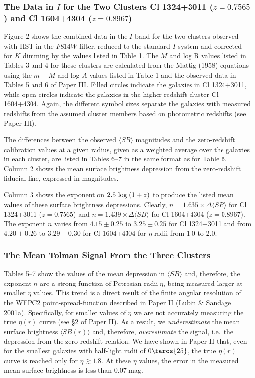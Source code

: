 \documentclass[preprint]{aastex}
\begin{document}
\subsubsection{The Data in $I$ for the Two Clusters Cl 1324+3011 
($z = 0.7565$) and Cl 1604+4304 ($z = 0.8967$)}
 
Figure 2 shows the combined data in the $I$ band for the two clusters
observed with HST in the $F814W$ filter, reduced to the standard $I$
system and corrected for $K$ dimming by the values listed in Table
1. The $M$ and log R values listed in Tables 3 and 4 for these
clusters are calculated from the Mattig (1958) equations using the $m
- M$ and log $A$ values listed in Table 1 and the observed data in
Tables 5 and 6 of Paper III.  Filled circles indicate the galaxies in
Cl 1324+3011, while open circles indicate the galaxies in the
higher-redshift cluster Cl 1604+4304. Again, the different symbol
sizes separate the galaxies with measured redshifts from the assumed
cluster members based on photometric redshifts (see Paper III).

The differences between the observed $\langle SB \rangle$ magnitudes
and the zero-redshift calibration values at a given radius, given as a
weighted average over the galaxies in each cluster, are listed in
Tables 6--7 in the same format as for Table 5. Column 2 shows the mean
surface brightness depression from the zero-redshift fiducial line,
expressed in magnitudes.

Column 3 shows the exponent on $2.5~{\rm log}~(1 + z)$ to produce the
listed mean values of these surface brightness depressions.  Clearly,
$n = 1.635 \times \Delta \langle SB \rangle$ for Cl 1324+3011 ($z =
0.7565$) and $n = 1.439 \times \Delta \langle SB \rangle$ for Cl
1604+4304 ($z = 0.8967$). The exponent $n$ varies from $4.15 \pm 0.25$
to $3.25 \pm 0.25$ for Cl 1324+3011 and from $4.20 \pm 0.26$ to $3.29
\pm 0.30$ for Cl 1604+4304 for $\eta$ radii from 1.0 to 2.0.

\subsubsection{The Mean Tolman Signal From the Three Clusters} 

Tables 5--7 show the values of the mean depression in $\langle SB
\rangle$ and, therefore, the exponent $n$ are a strong function of
Petrosian radii $\eta$, being measured larger at smaller $\eta$
values. This trend is a direct result of the finite angular resolution
of the WFPC2 point-spread-function described in Paper II (Lubin \&
Sandage 2001a).  Specifically, for smaller values of $\eta$ we are not
accurately measuring the true $\eta(r)$ curve (see \S 2 of Paper
II). As a result, we {\it underestimate} the mean surface brightness
$\langle SB(r) \rangle$ and, therefore, {\it overestimate} the signal,
i.e.\ the depression from the zero-redshift relation. We have shown in
Paper II that, even for the smallest galaxies with half-light radii of
$0\farcs{25}$, the true $\eta(r)$ curve is reached only for $\eta
\gtrsim 1.8$. At these $\eta$ values, the error in the measured mean
surface brightness is less than 0.07 mag.
\end{document}
